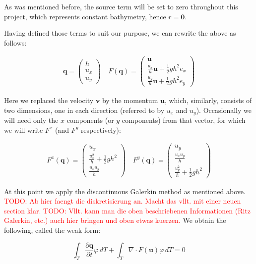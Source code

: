 \documentclass{article}
\newcommand{\todo}[2][]{\textcolor{red}{TODO\ifthenelse{\equal{#1}{}}{}{[#1]}: #2}}
\newcommand{\pd}[2]{\dfrac{\partial #1}{\partial #2}}
\renewcommand{\phi}{\varphi}
\begin{document}
As was mentioned before, the source term will be set to zero throughout this project, which represents constant bathymetry, hence $r=\mathbf{0}$.

Having defined those terms to suit our purpose, we can rewrite the above as follows:

\begin{eqnarray}
  \label{eqn:shallow-water-flux}
  \mathbf{q} =
  \begin{pmatrix}
    h \\ u_x \\ u_y
  \end{pmatrix} \quad
  F(\mathbf{q}) =
  \begin{pmatrix}
    \mathbf{u} \\ \frac{u_x}{h}\mathbf{u} + \frac{1}{2} g h^2 e_x \\ \frac{u_y}{h}\mathbf{u} + \frac{1}{2} g h^2 e_y
  \end{pmatrix}
\end{eqnarray}

Here we replaced the velocity $\mathbf{v}$ by the momentum $\mathbf{u}$, which, similarly, consists of two dimensions, one in each direction (referred to by $u_x$ and $u_y$). Occasionally we will need only the $x$ components (or $y$ components) from that vector, for which we will write $F^x$ (and $F^y$ respectively):

\begin{eqnarray*}
  F^x(\mathbf{q}) =
  \begin{pmatrix}
    u_x \\ \frac{u_x^2}{h} + \frac{1}{2} g h^2 \\ \frac{u_x u_y}{h}
  \end{pmatrix}
  \quad
  F^y(\mathbf{q}) =
  \begin{pmatrix}
    u_y \\ \frac{u_x u_y}{h} \\ \frac{u_y^2}{h} + \frac{1}{2} g h^2
  \end{pmatrix}
\end{eqnarray*}

At this point we apply the discontinuous Galerkin method as mentioned above.
\todo{Ab hier faengt die diskretisierung an. Macht das vllt. mit einer neuen section klar.}
\todo{Vllt. kann man die oben beschriebenen Informationen (Ritz Galerkin, etc.) auch hier bringen und oben etwas kuerzen.}
We obtain the following, called the weak form:

\begin{equation}
  \label{eq:shallow-water-weak-form}
  \int_T \pd{\mathbf{q}}{t} \phi \,dT + \int_T \nabla \cdot F(\mathbf{u}) \phi \,dT = 0
\end{equation}
\end{document}
